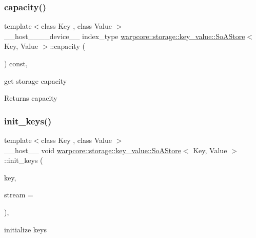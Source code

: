 \subsubsection{\texorpdfstring{capacity()}{capacity()}}
{\footnotesize\ttfamily template$<$class Key , class Value $>$ \\
\+\_\+\+\_\+host\+\_\+\+\_\+\+\_\+\+\_\+device\+\_\+\+\_\+ index\+\_\+type \hyperlink{classwarpcore_1_1storage_1_1key__value_1_1SoAStore}{warpcore\+::storage\+::key\+\_\+value\+::\+So\+A\+Store}$<$ Key, Value $>$\+::capacity (\begin{DoxyParamCaption}{ }\end{DoxyParamCaption}) const\hspace{0.3cm}{\ttfamily [inline]}, {\ttfamily [noexcept]}}



get storage capacity 

\begin{DoxyReturn}{Returns}
capacity 
\end{DoxyReturn}
\mbox{\label{classwarpcore_1_1storage_1_1key__value_1_1SoAStore_a7de9b497084433d27ae6ac63745ba541}} 
\subsubsection{\texorpdfstring{init\+\_\+keys()}{init\_keys()}}
{\footnotesize\ttfamily template$<$class Key , class Value $>$ \\
\+\_\+\+\_\+host\+\_\+\+\_\+ void \hyperlink{classwarpcore_1_1storage_1_1key__value_1_1SoAStore}{warpcore\+::storage\+::key\+\_\+value\+::\+So\+A\+Store}$<$ Key, Value $>$\+::init\+\_\+keys (\begin{DoxyParamCaption}\item[{const key\+\_\+type}]{key,  }\item[{const cuda\+Stream\+\_\+t}]{stream = {} }\end{DoxyParamCaption})\hspace{0.3cm}{\ttfamily [inline]}, {\ttfamily [noexcept]}}



initialize keys 


